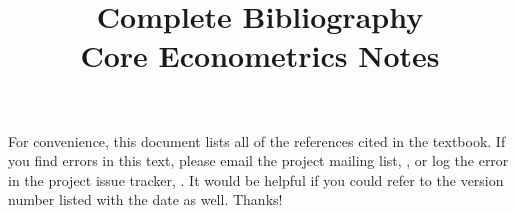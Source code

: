 \documentclass[nohyper]{tufte-handout}
\title[Complete bibliography]%
{Complete Bibliography \\
  Core Econometrics Notes}
\begin{document}
\maketitle

For convenience, this document lists all of the references cited in
the textbook.  If you find errors in this text, please email the
project mailing list, \maillist, or log the error in the project issue
tracker, \bugtrack.  It would be helpful if you could refer to the
version number listed with the date as well.  Thanks!

\nocite{*}


\end{document}
